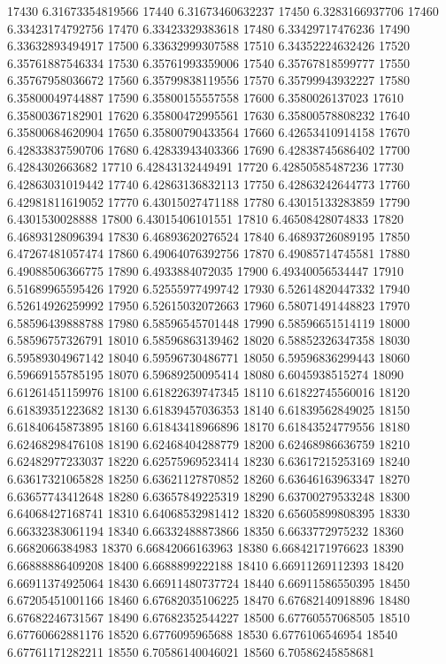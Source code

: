 {17430 6.31673354819566
17440 6.31673460632237
17450 6.3283166937706
17460 6.33423174792756
17470 6.33423329383618
17480 6.33429717476236
17490 6.33632893494917
17500 6.33632999307588
17510 6.34352224632426
17520 6.35761887546334
17530 6.35761993359006
17540 6.35767818599777
17550 6.35767958036672
17560 6.35799838119556
17570 6.35799943932227
17580 6.35800049744887
17590 6.35800155557558
17600 6.3580026137023
17610 6.35800367182901
17620 6.35800472995561
17630 6.35800578808232
17640 6.35800684620904
17650 6.35800790433564
17660 6.42653410914158
17670 6.42833837590706
17680 6.42833943403366
17690 6.42838745686402
17700 6.4284302663682
17710 6.42843132449491
17720 6.42850585487236
17730 6.42863031019442
17740 6.42863136832113
17750 6.42863242644773
17760 6.42981811619052
17770 6.43015027471188
17780 6.43015133283859
17790 6.4301530028888
17800 6.43015406101551
17810 6.46508428074833
17820 6.46893128096394
17830 6.46893620276524
17840 6.46893726089195
17850 6.47267481057474
17860 6.49064076392756
17870 6.49085714745581
17880 6.49088506366775
17890 6.4933884072035
17900 6.49340056534447
17910 6.51689965595426
17920 6.52555977499742
17930 6.52614820447332
17940 6.52614926259992
17950 6.52615032072663
17960 6.58071491448823
17970 6.58596439888788
17980 6.58596545701448
17990 6.58596651514119
18000 6.58596757326791
18010 6.58596863139462
18020 6.58852326347358
18030 6.59589304967142
18040 6.59596730486771
18050 6.59596836299443
18060 6.59669155785195
18070 6.59689250095414
18080 6.6045938515274
18090 6.61261451159976
18100 6.61822639747345
18110 6.61822745560016
18120 6.61839351223682
18130 6.61839457036353
18140 6.61839562849025
18150 6.61840645873895
18160 6.61843418966896
18170 6.61843524779556
18180 6.62468298476108
18190 6.62468404288779
18200 6.62468986636759
18210 6.62482977233037
18220 6.62575969523414
18230 6.63617215253169
18240 6.63617321065828
18250 6.63621127870852
18260 6.63646163963347
18270 6.63657743412648
18280 6.63657849225319
18290 6.63700279533248
18300 6.64068427168741
18310 6.64068532981412
18320 6.65605899808395
18330 6.66332383061194
18340 6.66332488873866
18350 6.6633772975232
18360 6.6682066384983
18370 6.66842066163963
18380 6.66842171976623
18390 6.66888886409208
18400 6.6688899222188
18410 6.66911269112393
18420 6.66911374925064
18430 6.66911480737724
18440 6.66911586550395
18450 6.67205451001166
18460 6.67682035106225
18470 6.67682140918896
18480 6.67682246731567
18490 6.67682352544227
18500 6.67760557068505
18510 6.67760662881176
18520 6.6776095965688
18530 6.6776106546954
18540 6.67761171282211
18550 6.70586140046021
18560 6.70586245858681
}
